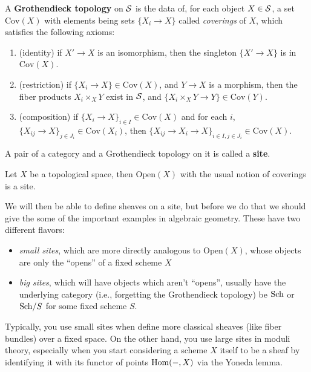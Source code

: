 \documentclass[12pt]{article}
\newcommand{\Cov}{\mathrm{Cov}}
\begin{document}
\begin{defn}
    A \textbf{Grothendieck topology} on $\mathcal{S}$ is the data of, for each object $X\in \mathcal{S}$, a set $\Cov(X)$ with elements being sets $\{X_i \to X\}$ called \textit{coverings} of $X$, which satisfies the following axioms:
    \begin{enumerate}
        \item (identity) if $X'\to X$ is an isomorphism, then the singleton $\{X'\to X\}$ is in $\Cov(X)$.
        \item (restriction) if $\{X_i\to X\}\in \Cov(X)$, and $Y\to X$ is a morphism, then the fiber products $X_i \times_X Y$ exist in $\mathcal{S}$, and $\{X_i\times_X Y\to Y\}\in \Cov(Y)$.
        \item (composition) if $\{X_i\to X\}_{i\in I}\in \Cov(X)$ and for each $i$, $\{X_{ij}\to X\}_{j\in J_i} \in \Cov(X_i)$, then $\{X_{ij}\to X_i \to X\}_{i\in I, j\in J_i}\in \Cov(X)$.
    \end{enumerate}

    A pair of a category and a Grothendieck topology on it is called a \textbf{site}.
\end{defn}

\begin{eg}
    Let $X$ be a topological space, then $\mathrm{Open}(X)$ with the usual notion of coverings is a site.
\end{eg}

\begin{rmk}
    We will then be able to define sheaves on a site, but before we do that we should give the some of the important examples in algebraic geometry. These have two different flavors:
    \begin{itemize}
        \item \textit{small sites}, which are more directly analogous to $\mathrm{Open}(X)$, whose objects are only the ``opens'' of a fixed scheme $X$
        \item \textit{big sites}, which will have objects which aren't ``opens'', usually have the underlying category (i.e., forgetting the Grothendieck topology) be $\mathrm{Sch}$ or $\mathrm{Sch}/S$ for some fixed scheme $S$.
    \end{itemize}

    Typically, you use small sites when define more classical sheaves (like fiber bundles) over a fixed space. On the other hand, you use large sites in moduli theory, especially when you start considering a scheme $X$ itself to be a sheaf by identifying it with its functor of points $\mathrm{Hom}(-,X)$ via the Yoneda lemma.
\end{rmk}
\end{document}
